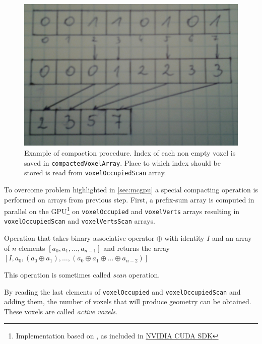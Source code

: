 \begin{figure}[hb]
	\begin{center}
		\includegraphics[width=\textwidth]{chapters/marchingcubes/compact.jpg}
	\end{center}
	\caption{Example of compaction procedure. Index of each non empty voxel
		is saved in \texttt{compactedVoxelArray}. Place to which index
		should be stored is read from \texttt{voxelOccupiedScan} array.
	}
	\label{fig:mccompact}
\end{figure}

To overcome problem highlighted in \autoref{sec:mcgpu} a special compacting
operation is performed on arrays from previous step. First, a prefix-sum array
is computed in parallel on the GPU\footnote{Implementation based on \cite{gpugemsscan},
as included in \href{https://developer.nvidia.com/cuda-downloads}{NVIDIA CUDA SDK}}
on \texttt{voxelOccupied} and \texttt{voxelVerts} arrays resulting in
\texttt{voxelOccupiedScan} and \texttt{voxelVertsScan} arrays.

\begin{defn}
Operation that takes binary associative operator $\oplus$ with identity $I$ and
an array of $n$ elements $[a_0,a_1,\ldots,a_{n-1}]$ and returns the array
$[I,a_0,(a_0\oplus a_1),\ldots,(a_0\oplus a_1 \oplus \ldots \oplus a_{n-2})]$

This operation is sometimes called \emph{scan} operation.
\end{defn}

By reading the last elements of \texttt{voxelOccupied} and
\texttt{voxelOccupiedScan} and adding them, the number of voxels that will
produce geometry can be obtained. These voxels are called \emph{active voxels}.

